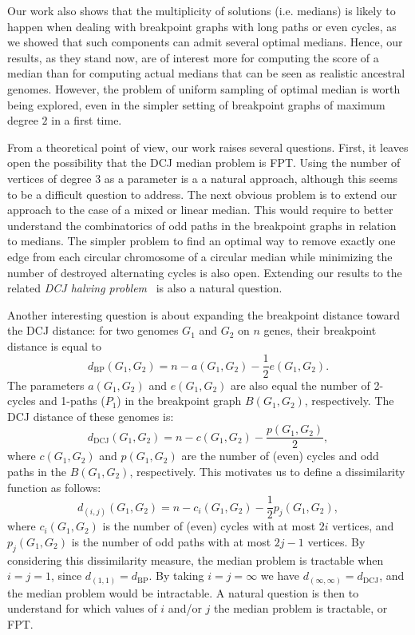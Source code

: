\documentclass[10pt]{llncs}
\begin{document}
Our work also shows that the multiplicity of solutions (i.e. medians)
is likely to happen when dealing with breakpoint graphs with long
paths or even cycles, as we showed that such components can admit
several optimal medians. Hence, our results, as they stand now, are of
interest more for computing the score of a median than for computing
actual medians that can be seen as realistic ancestral
genomes. However, the problem of uniform sampling of optimal median is
worth being explored, even in the simpler setting of breakpoint graphs
of maximum degree $2$ in a first time.

From a theoretical point of view, our work raises several
questions. First, it leaves open the possibility that the DCJ median
problem is FPT. Using the number of vertices of degree $3$ as a
parameter is a a natural approach, although this seems to be a
difficult question to address. The next obvious problem is to extend
our approach to the case of a mixed or linear median. This would
require to better understand the combinatorics of odd paths in the
breakpoint graphs in relation to medians. The simpler problem to find
an optimal way to remove exactly one edge from each circular
chromosome of a circular median while minimizing the number of
destroyed alternating cycles is also open. Extending our results to
the related \emph{DCJ halving problem}~\cite{Tannier2009} is also a
natural question.

Another interesting question is about expanding the breakpoint
distance toward the DCJ distance: for two genomes $G_1$ and $G_2$ on
$n$ genes, their breakpoint distance is equal to
$$d_{\text{BP}}(G_1, G_2) = n - a(G_1, G_2) - \frac{1}{2}e(G_1,
G_2).$$ The parameters $a(G_1, G_2)$ and $e(G_1, G_2)$ are also equal
the number of 2-cycles and 1-paths ($P_1$) in the breakpoint graph
$B(G_1, G_2)$, respectively.  The DCJ distance of these genomes is:
$$d_{\text{DCJ}}(G_1, G_2) = n - c(G_1, G_2) - \frac{p(G_1,
  G_2)}{2},$$ where $c(G_1, G_2)$ and $p(G_1, G_2)$ are the number of
(even) cycles and odd paths in the $B(G_1, G_2)$, respectively. This
motivates us to define a dissimilarity function as follows:
$$d_{(i, j)}(G_1, G_2) = n - c_i(G_1, G_2) - \frac{1}{2}p_j(G_1,
G_2),$$ where $c_i(G_1, G_2)$ is the number of (even) cycles with at
most $2i$ vertices, and $p_j(G_1, G_2)$ is the number of odd paths
with at most $2j-1$ vertices.  By considering this dissimilarity
measure, the median problem is tractable when $i = j = 1$, since
$d_{(1, 1)} = d_{\text{BP}}$. By taking $i = j = \infty$ we have
$d_{(\infty, \infty)} = d_{\text{DCJ}}$, and the median problem would
be intractable. A natural question is then to understand for which
values of $i$ and/or $j$ the median problem is tractable, or FPT.
\end{document}
